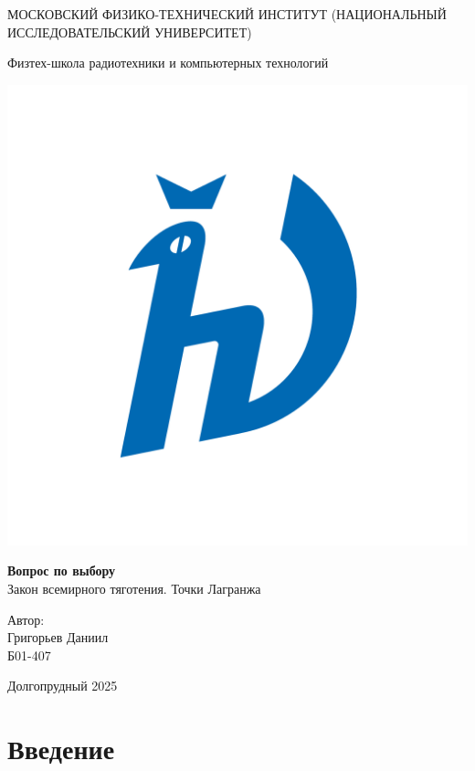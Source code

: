 \documentclass[a4paper,12pt]{article}
\begin{document}
                           

\begin{titlepage}
\begin{center}
    {\large МОСКОВСКИЙ ФИЗИКО-ТЕХНИЧЕСКИЙ ИНСТИТУТ (НАЦИОНАЛЬНЫЙ ИССЛЕДОВАТЕЛЬСКИЙ УНИВЕРСИТЕТ)}
\end{center}

\begin{center}
    {\large Физтех-школа радиотехники и компьютерных технологий}
\end{center}

\vspace{3.5cm}

\begin{center}
    \includegraphics[width=0.4\linewidth]{hv_full.png}
\end{center}

\vspace{0.1cm}

{\huge
\begin{center}
    {\bf Вопрос по выбору}\\
    Закон всемирного тяготения. Точки Лагранжа
\end{center}
}

\vspace{2cm}

\begin{flushright}
{\LARGE Автор:\\ Григорьев Даниил \\
\vspace{0.2cm}
Б01-407}
\end{flushright}

\vspace{3.5cm}
\begin{center}
    Долгопрудный 2025
\end{center}
\end{titlepage}

\section{Введение}
\end{document}
